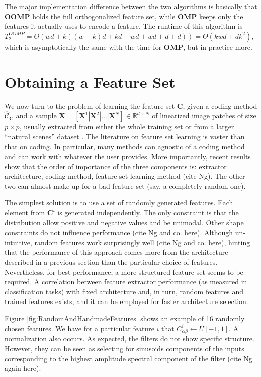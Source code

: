 \documentclass[12pt,a4paper,oneside,english]{UPBThesis}
\newcommand{\hctimes}[2]{{#1}\!\times\!{#2}}
\begin{document}
The major implementation difference between the two algorithms is basically that \textbf{OOMP} holds the full orthogonalized feature set, while \textbf{OMP} keeps only the features it actually uses to encode a feature. The runtime of this algorithm is $T_2^{OOMP} = \Theta(wd + k((w-k)d + kd + wd + wd + d + d)) = \Theta(kwd + dk^2)$, which is asymptotically the same with the time for \textbf{OMP}, but in practice more.

\chapter{Obtaining a Feature Set}

We now turn to the problem of learning the feature set $\textbf{C}$, given a coding method $\hat{\mathcal{C}}_\textbf{C}$ and a sample $\textbf{X} = \left[ \textbf{X}^1 \left|\right. \textbf{X}^2 \left|\right. \dots \left|\right. \textbf{X}^N \right] \in \mathbb{R}^{\hctimes{d}{N}}$ of linearized image patches of size $\hctimes{p}{p}$, usually extracted from either the whole training set or from a larger ``natural scenes'' dataset \cite{self-taught-learning}. The literature on feature set learning is vaster than that on coding. In particular, many methods can agnostic of a coding method and can work with whatever the user provides. More importantly, recent results show that the order of importance of the three components is: extractor architecture, coding method, feature set learning method (cite Ng). The other two can almost make up for a bad feature set (say, a completely random one).

The simplest solution is to use a set of randomly generated features. Each element from $\textbf{C}^i$ is generated independently. The only constraint is that the distribution allow positive and negative values and be unimodal. Other shape constraints do not influence performance (cite Ng and co. here). Although un-intuitive, random features work surprisingly well (cite Ng and co. here), hinting that the performance of this approach comes more from the architecture described in a previous section than the particular choice of features. Nevertheless, for best performance, a more structured feature set seems to be required. A correlation between feature extractor performance (as measured in classification tasks) with fixed architecture and, in turn, random features and trained features exists, and it can be employed for faster architecture selection.

Figure \ref{fig:RandomAndHandmadeFeatures} shows an example of 16 randomly chosen features. We have for a particular feature $i$ that $C^i_{\alpha\beta} \leftarrow U[-1,1]$. A normalization also occurs. As expected, the filters do not show specific structure. However, they can be seen as selecting for sinusoids components of the inputs corresponding to the highest amplitude spectral component of the filter (cite Ng again here).
\end{document}
